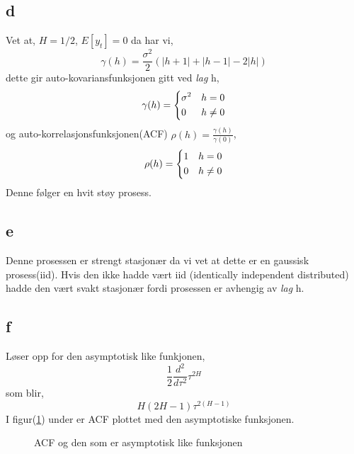 \documentclass[10pt]{article}
\begin{document}
{\subsection{d}

Vet at,
$H = 1/2$, $E[y_{t}] = 0$
da har vi,
\begin{equation}
  \gamma(h) = \frac{\sigma^2}{2}(|h+1| + |h-1| -2|h|)
\end{equation}
dette gir auto-kovariansfunksjonen gitt ved \emph{lag} h,
\[
 \gamma(h) = \begin{dcases}
      \sigma^2  & h = 0 \\
      0 & h \neq 0 \\
  \end{dcases}
\]
og auto-korrelasjonsfunksjonen(ACF) $\rho(h) = \frac{\gamma(h)}{\gamma(0)}$,
\[
 \rho(h) = \begin{dcases}
      1 & h = 0 \\
      0 & h \neq 0 \\
  \end{dcases}
\]
Denne følger en hvit støy prosess.


\subsection{e}
Denne prosessen er strengt stasjonær da vi vet at dette er en gaussisk prosess(iid).
Hvis den ikke hadde vært iid (identically independent distributed) hadde den vært svakt stasjonær fordi prosessen er avhengig av \emph{lag} h.



\subsection{f}
Løser opp for den asymptotisk like funkjonen,
\begin{equation*}
  \frac{1}{2}\frac{d^2}{d\tau^2}\tau^{2H}
\end{equation*}
som blir,
\begin{equation*}
  H(2H-1)\tau^{2(H-1)}
\end{equation*}
I figur(\ref{asymp}) under er ACF plottet med den asymptotiske funksjonen.
\begin{figure}[hbt!]
\caption{ACF og den som er asymptotisk like funksjonen}
\label{asymp}
\end{figure}

}
\end{document}
